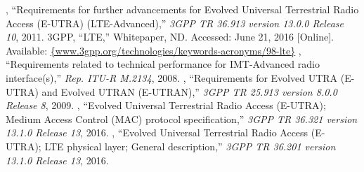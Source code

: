 %

\begin{thebibliography}{99.}%
	, ``Requirements for further advancements for Evolved Universal Terrestrial Radio Access (E-UTRA) (LTE-Advanced),'' \emph{{3GPP TR 36.913 version 13.0.0 Release 10}}, 2011.
	 3GPP, ``{LTE},'' Whitepaper, ND. Accessed: June 21, 2016 [Online]. Available: \url{{www.3gpp.org/technologies/keywords-acronyms/98-lte}}
	, ``Requirements related to technical performance for IMT-Advanced radio interface(s),'' \emph{Rep. ITU-R M.2134}, 2008. 
	, ``Requirements for Evolved UTRA (E-UTRA) and Evolved UTRAN (E-UTRAN),'' \emph{{3GPP TR 25.913 version 8.0.0 Release 8}}, 2009.
	, ``Evolved Universal Terrestrial Radio Access (E-UTRA); Medium Access Control (MAC) protocol specification,'' \emph{{3GPP TR 36.321 version 13.1.0 Release 13}}, 2016.
	, ``Evolved Universal Terrestrial Radio Access (E-UTRA); LTE physical layer; General description,'' \emph{{3GPP TR 36.201 version 13.1.0 Release 13}}, 2016.	
\end{thebibliography}